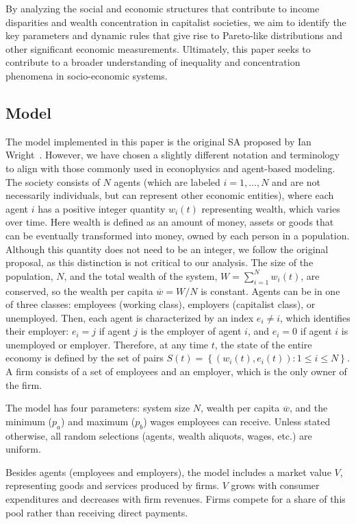 By analyzing the social and economic structures that contribute to income disparities and wealth concentration in capitalist societies, we aim to identify the key parameters and dynamic rules that give rise to Pareto-like distributions and other significant economic measurements. Ultimately, this paper seeks to contribute to a broader understanding of inequality and concentration phenomena in socio-economic systems.

\subsection{Model}

The model implemented in this paper is the original SA proposed by Ian Wright~\cite{WRIGHT2005589}. However, we have chosen a slightly different notation and terminology to align with those commonly used in econophysics and agent-based modeling.
The society consists of $N$ agents (which are labeled $i=1,\dots,N$ and are not necessarily individuals, but can represent other economic entities), where each agent $i$ has a positive integer quantity $w_i(t)$ representing wealth, 
which varies over time. 
Here wealth is defined as an amount of money, assets or goods that can be eventually transformed into money, owned by each person in a population. Although this quantity does not need to be an integer, we follow the original proposal, as this distinction is not critical to our analysis.
%
The size of the population, $N$, and the total wealth of the system, $W= \sum_{i=1}^N w_i(t)$, are conserved, so the wealth per capita $\overline{w}=W/N$ is constant. 
Agents can be in one of three classes: employees (working class), employers (capitalist class), or unemployed. 
Then, each agent is characterized by an index $e_i\neq i$, which identifies their employer: $e_i = j$ if agent $j$ is the employer of agent $i$, and $e_i = 0$ if agent $i$ is unemployed or employer.
Therefore, at any time $t$,  the state of the entire economy is defined by the set of pairs $S(t) = \left\{ \left( w_i(t), e_i(t) \right) :1\leq i\leq N \right\}$.
%
A firm consists of a set of employees and an employer, which is the only owner of the firm.

The model has four parameters: system size $N$, wealth per capita $\overline{w}$, and the minimum ($p_a$) and maximum ($p_b$) wages employees can receive. Unless stated otherwise, all random selections (agents, wealth aliquots, wages, etc.) are uniform.

 Besides agents (employees and employers), the model includes a market value $V$, representing goods and services produced by firms. $V$ grows with consumer expenditures and decreases with firm revenues. Firms compete for a share of this pool rather than receiving direct payments. 

